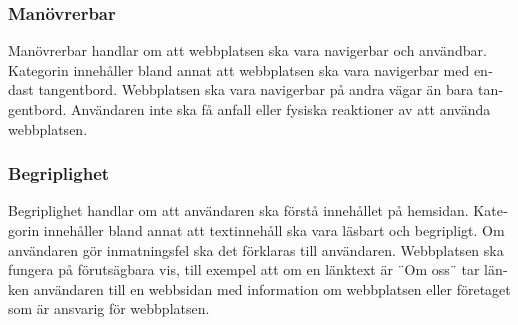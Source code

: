 \documentclass[11p]{article}
\begin{document}
\begin{otherlanguage}{swedish}
    \subsubsection{Manövrerbar}
    Manövrerbar handlar om att webbplatsen ska vara navigerbar och användbar.
    Kategorin innehåller bland annat att webbplatsen ska vara navigerbar med endast tangentbord.
    Webbplatsen ska vara navigerbar på andra vägar än bara tangentbord.
    Användaren inte ska få anfall eller fysiska reaktioner av att använda webbplatsen.

    \subsubsection{Begriplighet}
    Begriplighet handlar om att användaren ska förstå innehållet på hemsidan.
    Kategorin innehåller bland annat att textinnehåll ska vara läsbart och begripligt.
    Om användaren gör inmatningsfel ska det förklaras till användaren.
    Webbplatsen ska fungera på förutsägbara vis, till exempel att om en länktext är ¨Om oss¨ tar länken användaren till en webbsidan med information om webbplatsen eller företaget som är ansvarig för webbplatsen.


\end{otherlanguage}
\end{document}
